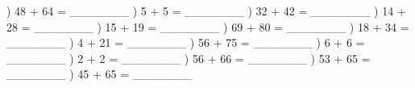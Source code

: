 \documentclass{article}%
\begin{document}
\newline%
) 48 + 64 = \_\_\_\_\_\_\_%
\newline%
\newline%
) 5 + 5 = \_\_\_\_\_\_\_%
\newline%
\newline%
) 32 + 42 = \_\_\_\_\_\_\_%
\newline%
\newline%
) 14 + 28 = \_\_\_\_\_\_\_%
\newline%
\newline%
) 15 + 19 = \_\_\_\_\_\_\_%
\newline%
\newline%
) 69 + 80 = \_\_\_\_\_\_\_%
\newline%
\newline%
) 18 + 34 = \_\_\_\_\_\_\_%
\newline%
\newline%
) 4 + 21 = \_\_\_\_\_\_\_%
\newline%
\newline%
) 56 + 75 = \_\_\_\_\_\_\_%
\newline%
\newline%
) 6 + 6 = \_\_\_\_\_\_\_%
\newline%
\newline%
) 2 + 2 = \_\_\_\_\_\_\_%
\newline%
\newline%
) 56 + 66 = \_\_\_\_\_\_\_%
\newline%
\newline%
) 53 + 65 = \_\_\_\_\_\_\_%
\newline%
\newline%
) 45 + 65 = \_\_\_\_\_\_\_%
\newline%
\newline%
\newline%
\end{document}
